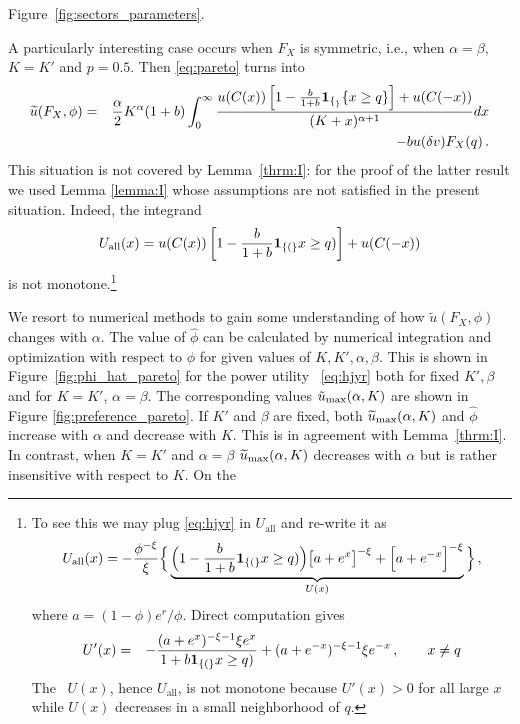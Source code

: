 Figure~\ref{fig:sectors_parameters}.
\par
A particularly interesting case occurs  when 
$F_X$ is symmetric, i.e., when $\alpha = \beta$, $K =K'$ and $p=0.5$.
Then \eqref{eq:pareto} turns into 
\begin{eqnarray}
  \widetilde u(F_X, \phi) &=& {\alpha \over 2} K^\alpha (1 + b)
  \int_{0}^\infty {
    u(C(x)) \left[
      1 - {b \over 1 + b} \mathbf{1}_{\{_\}} {\{x \ge q\}}
      \right]
    + u(C(-x))
    \over
    (K + x)^{\alpha + 1}
  } dx \nonumber \\
  && - b u(\delta v) F_X(q)\,.
  \label{eq:ipf}
\end{eqnarray} 
This situation is not covered by Lemma~\ref{thrm:I}:
for the proof of the latter result we used Lemma \ref{lemma:I} whose
assumptions are not satisfied in the present situation.
Indeed, the integrand 
\[
U_{\text{all}}(x) =
u(C(x)) \left[
  1 - {b \over 1 + b}\mathbf{1}_{\{(\}}x \ge q)
  \right]
+ u(C(-x))
\]
is not monotone.\footnote{To see this we may plug \eqref{eq:hjyr} 
in $U_{\text{all}}$ and re-write it as
\[U_{\text{all}}(x) =
  -{\phi^{-\xi} \over \xi} \Big\{
  \underbrace{
    \Big(1 - {b \over 1 + b}\mathbf{1}_{\{(\}}x \ge q)\Big)
    \big[a + e^x\big]^{-\xi}
    +
    \Big[a + e^{-x}\Big]^{-\xi}
  }_{U(x)} \Big\}\,,
\]
where $a = (1 - \phi) e^r/\phi$.
Direct computation gives
\begin{eqnarray*}
  U'(x)
  &=&
  -{(a + e^x)^{-\xi - 1} \xi e^x
    \over
    1 + b \mathbf{1}_{\{(\}}x \ge  q)
  } + (a + e^{-x})^{-\xi - 1} \xi e^{-x}\,,
  \qquad x \neq q
\end{eqnarray*} 
The \fct\ $U(x)$, hence $U_{\text{all}}$, 
is not monotone because $U'(x)>0$ for all large $x$ while $U(x)$ decreases
in a small neighborhood of $q$.}
\par
We resort to numerical methods to gain some understanding of
how $\tilde u(F_X, \phi)$ changes with $\alpha$.
The value of $\hat\phi$ can be calculated
by numerical integration and optimization with respect to $\phi$ for
given values of $K, K', \alpha, \beta$.  This is shown in 
Figure~\ref{fig:phi_hat_pareto} for the power utility \fct\
\eqref{eq:hjyr} both for fixed $K', \beta$ and for $K=K'$, $\alpha=\beta$.  
The corresponding values $\tilde u_{\rm max}(\alpha, K)$
are shown in Figure \ref{fig:preference_pareto}.
If $K'$ and $\beta$ are fixed, both $\widetilde u_{\rm max}(\alpha, K)$ 
and $\hat\phi$ increase  with $\alpha$ and decrease with $K$. 
This is in agreement with Lemma~\ref{thrm:I}. 
In contrast, when $K=K'$ and $\alpha=\beta$
$\widetilde u_{\rm max}(\alpha, K)$ decreases with $\alpha$ 
but is rather insensitive with respect to $K$. On the
